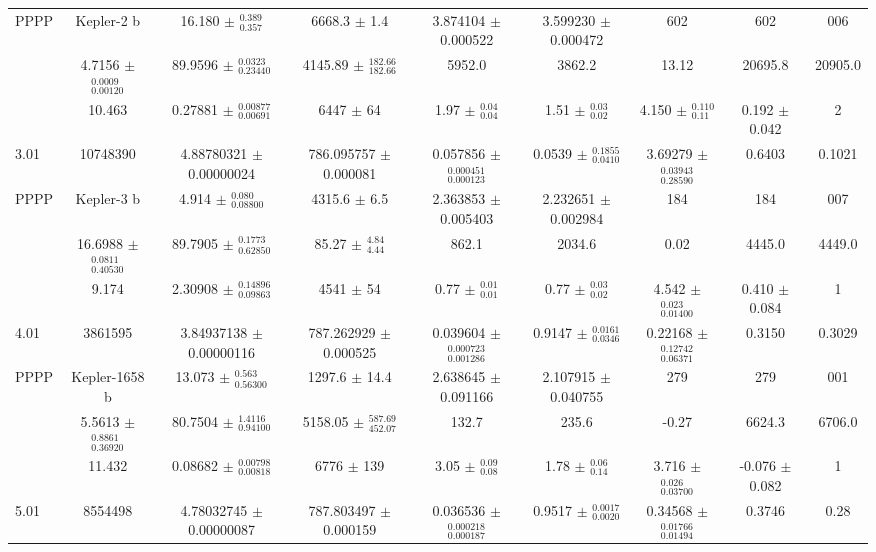 \documentclass{aastex62}
\begin{document}
\begin{longrotatetable}
\begin{table}[!hbt]
\begin{tabular}{l c c c c c c c c}
PPPP & Kepler-2 b & 16.180 $\pm$ $^{ 0.389 } _{ 0.357 }$ & 6668.3 $\pm$ 1.4 & 3.874104 $\pm$ 0.000522 & 3.599230 $\pm$ 0.000472 & 602 & 602 & 006 \\
& 4.7156 $\pm$ $^{ 0.0009 } _{ 0.00120 }$ & 89.9596 $\pm$ $^{ 0.0323 } _{ 0.23440 }$ & 4145.89 $\pm$ $^{ 182.66 } _{ 182.66 }$ & 5952.0 & 3862.2 & 13.12 & 20695.8 & 20905.0 \\
& 10.463 & 0.27881 $\pm$ $^{ 0.00877 } _{ 0.00691 }$ & 6447 $\pm$ 64 & 1.97 $\pm$ $^{ 0.04 } _{ 0.04 }$ & 1.51 $\pm$ $^{ 0.03 } _{ 0.02 }$ & 4.150 $\pm$ $^{ 0.110 } _{ 0.11 }$ & 0.192 $\pm$ 0.042 & 2 \\
[.2cm]
3.01 & 10748390 & 4.88780321 $\pm$ 0.00000024 & 786.095757 $\pm$ 0.000081 & 0.057856 $\pm$ $^{ 0.000451 } _{ 0.000123 }$ & 0.0539 $\pm$ $^{ 0.1855 } _{ 0.0410 }$ & 3.69279 $\pm$ $^{ 0.03943 } _{ 0.28590 }$ & 0.6403 & 0.1021 \\
PPPP & Kepler-3 b & 4.914 $\pm$ $^{ 0.080 } _{ 0.08800 }$ & 4315.6 $\pm$ 6.5 & 2.363853 $\pm$ 0.005403 & 2.232651 $\pm$ 0.002984 & 184 & 184 & 007 \\
& 16.6988 $\pm$ $^{ 0.0811 } _{ 0.40530 }$ & 89.7905 $\pm$ $^{ 0.1773 } _{ 0.62850 }$ & 85.27 $\pm$ $^{ 4.84 } _{ 4.44 }$ & 862.1 & 2034.6 & 0.02 & 4445.0 & 4449.0 \\
& 9.174 & 2.30908 $\pm$ $^{ 0.14896 } _{ 0.09863 }$ & 4541 $\pm$ 54 & 0.77 $\pm$ $^{ 0.01 } _{ 0.01 }$ & 0.77 $\pm$ $^{ 0.03 } _{ 0.02 }$ & 4.542 $\pm$ $^{ 0.023 } _{ 0.01400 }$ & 0.410 $\pm$ 0.084 & 1 \\
[.2cm]
4.01 & 3861595 & 3.84937138 $\pm$ 0.00000116 & 787.262929 $\pm$ 0.000525 & 0.039604 $\pm$ $^{ 0.000723 } _{ 0.001286 }$ & 0.9147 $\pm$ $^{ 0.0161 } _{ 0.0346 }$ & 0.22168 $\pm$ $^{ 0.12742 } _{ 0.06371 }$ & 0.3150 & 0.3029 \\
PPPP & Kepler-1658 b & 13.073 $\pm$ $^{ 0.563 } _{ 0.56300 }$ & 1297.6 $\pm$ 14.4 & 2.638645 $\pm$ 0.091166 & 2.107915 $\pm$ 0.040755 & 279 & 279 & 001 \\
& 5.5613 $\pm$ $^{ 0.8861 } _{ 0.36920 }$ & 80.7504 $\pm$ $^{ 1.4116 } _{ 0.94100 }$ & 5158.05 $\pm$ $^{ 587.69 } _{ 452.07 }$ & 132.7 & 235.6 & -0.27 & 6624.3 & 6706.0 \\
& 11.432 & 0.08682 $\pm$ $^{ 0.00798 } _{ 0.00818 }$ & 6776 $\pm$ 139 & 3.05 $\pm$ $^{ 0.09 } _{ 0.08 }$ & 1.78 $\pm$ $^{ 0.06 } _{ 0.14 }$ & 3.716 $\pm$ $^{ 0.026 } _{ 0.03700 }$ & -0.076 $\pm$ 0.082 & 1 \\
[.2cm]
5.01 & 8554498 & 4.78032745 $\pm$ 0.00000087 & 787.803497 $\pm$ 0.000159 & 0.036536 $\pm$ $^{ 0.000218 } _{ 0.000187 }$ & 0.9517 $\pm$ $^{ 0.0017 } _{ 0.0020 }$ & 0.34568 $\pm$ $^{ 0.01766 } _{ 0.01494 }$ & 0.3746 & 0.28 \\

\end{tabular}
\end{table}
\end{longrotatetable}
\end{document}
